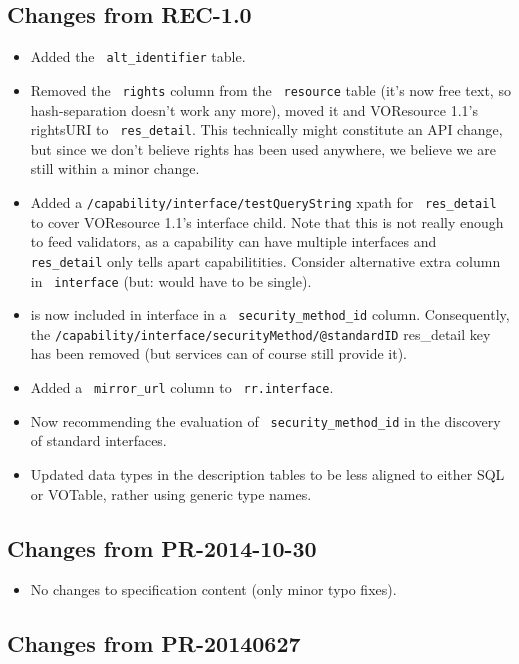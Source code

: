 \documentclass[11pt,a4paper]{ivoa}
\newcommand{\rtent}[1]{\texttt{\color{rtcolor} #1}}
\begin{document}
\subsection{Changes from REC-1.0}

\begin{itemize}
\item Added the \rtent{alt\_identifier} table.
\item Removed the \rtent{rights} column from the \rtent{resource} table
(it's now free text, so hash-separation doesn't work any more),
moved it and VOResource 1.1's rightsURI to \rtent{res\_detail}.  This
technically might constitute an API change, but since we don't believe
rights has been used anywhere, we believe we are still within a minor
change.
\item Added a \texttt{/capability/interface/testQueryString} xpath for
\rtent{res\_detail} to cover VOResource 1.1's 
interface child.  Note that this is not really enough to feed
validators, as a capability can have multiple interfaces and
\rtent{res\_detail} only tells apart capabilitities.  Consider
alternative extra column in \rtent{interface} (but:
 would have to be single).
\item {} is now included in interface
in a \rtent{security\_method\_id} column.  Consequently, the 
\texttt{/capability/inter\-face/securityMethod/@standardID} res\_detail
key has been removed (but services can of course still provide it).
\item Added a \rtent{mirror\_url} column to \rtent{rr.interface}.
\item Now recommending the evaluation of \rtent{security\_method\_id} in
the discovery of standard interfaces.
\item Updated data types in the description tables to be less aligned to
either SQL or VOTable, rather using generic type names.
\end{itemize}

\subsection{Changes from PR-2014-10-30}

\begin{itemize}
\item No changes to specification content (only minor typo fixes).
\end{itemize}


\subsection{Changes from PR-20140627}
\end{document}
